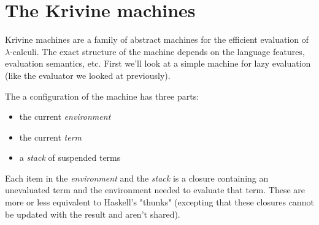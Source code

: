 \documentclass[a4paper]{article}
\begin{document}
\newcommand{\mconfig}[3]{\langle #1 \:\vert\: #2 \:\vert\: #3 \rangle}
\newcommand{\lvar}[1]{\mathbb{#1}}
\newcommand{\labs}[1]{\lambda.#1}
\newcommand{\lapp}[2]{(#1 \: #2)}
\newcommand{\mclosure}[2]{[#2]#1}

\section{The Krivine machines}

Krivine machines are a family of abstract machines for the efficient evaluation
of $\lambda$-calculi. The exact structure of the machine depends on the language
features, evaluation semantics, etc. First we'll look at a simple machine for
lazy evaluation (like the evaluator we looked at previously).

The a configuration of the machine has three parts:

\begin{itemize}
\item the current {\it environment}
\item the current {\it term}
\item a {\it stack} of suspended terms
\end{itemize}

Each item in the {\it environment} and the {\it stack} is a closure containing
an unevaluated term and the environment needed to evaluate that term. These are
more or less equivalent to Haskell's "thunks" (excepting that these closures
cannot be updated with the result and aren't shared).
\end{document}
